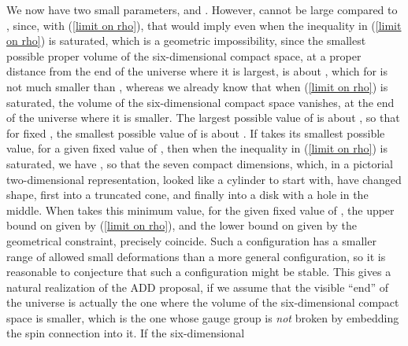 \documentclass[a4paper,12pt,oneside]{article}
\begin{document}
We now have two small parameters,
\coordHE{} and \coordHE{}.  However,
\coordHE{} cannot be large compared to \coordHE{}, 
since, with (\ref{limit on rho}), that would imply \coordHE{} even when the
inequality in (\ref{limit on rho}) is saturated, which is a 
geometric 
impossibility, since the smallest possible proper volume of the
six-dimensional compact space, at a proper distance \myHighlight{$\rho$}\coordHE{} from the
end of the universe where it is largest, is about \coordHE{}, which for \coordHE{} is not much smaller
than \coordHE{}, whereas we already know that when (\ref{limit on rho}) is 
saturated, the volume of the six-dimensional compact space
vanishes, at the end of the universe where it is smaller.  The 
largest possible value of \coordHE{} is about
\coordHE{}, so that for fixed \coordHE{}, the smallest possible
value of \coordHE{} is about \coordHE{}.  If \coordHE{} takes its
smallest possible value, for a given fixed value of \coordHE{}, then when
the inequality in (\ref{limit on rho}) is saturated, we have 
\coordHE{}, so that the seven compact dimensions, which, in a
pictorial two-dimensional representation, looked like a cylinder to 
start with, have changed shape, first into a truncated cone, and 
finally into a disk with a hole in the middle.  When \coordHE{} takes this 
minimum value, for the given fixed value of \coordHE{}, the upper bound on 
\myHighlight{$\rho$}\coordHE{} given by (\ref{limit on rho}), and the lower bound on \myHighlight{$\rho$}\coordHE{} 
given by the geometrical constraint, precisely coincide.  Such a 
configuration has a smaller range of allowed small deformations 
than a more general configuration, so it is reasonable to 
conjecture that such a configuration might be stable.  This gives a 
natural realization of the ADD proposal, if we assume that the 
visible ``end'' of the universe is actually the one where the 
volume of the six-dimensional compact space is smaller, which is the
one whose \coordHE{} gauge group is \emph{not} broken by 
embedding the spin connection into it.  If the six-dimensional
\end{document}
